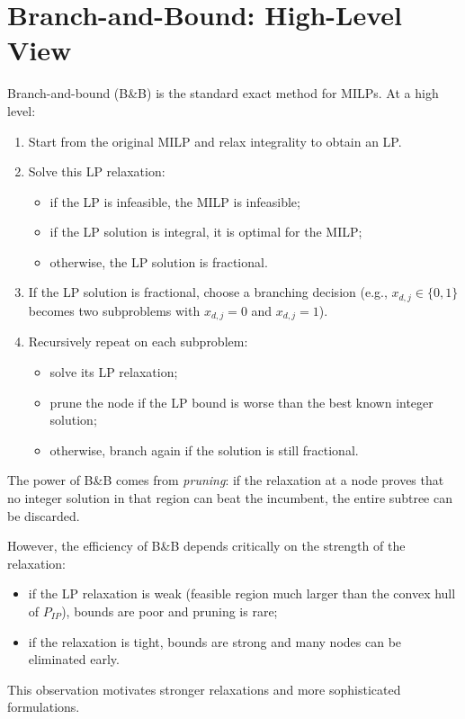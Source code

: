 \documentclass[11pt]{article}
\begin{document}
\section{Branch-and-Bound: High-Level View}

Branch-and-bound (B\&B) is the standard exact method for MILPs.
At a high level:
\begin{enumerate}
    \item Start from the original MILP and relax integrality to obtain an LP.
    \item Solve this LP relaxation:
    \begin{itemize}
        \item if the LP is infeasible, the MILP is infeasible;
        \item if the LP solution is integral, it is optimal for the MILP;
        \item otherwise, the LP solution is fractional.
    \end{itemize}
    \item If the LP solution is fractional, choose a branching decision
          (e.g., $x_{d,j} \in \{0,1\}$ becomes two subproblems with
          $x_{d,j} =0$ and $x_{d,j}=1$).
    \item Recursively repeat on each subproblem:
    \begin{itemize}
        \item solve its LP relaxation;
        \item prune the node if the LP bound is worse than the best known integer solution;
        \item otherwise, branch again if the solution is still fractional.
    \end{itemize}
\end{enumerate}
The power of B\&B comes from \emph{pruning}:
if the relaxation at a node proves that no integer solution in that region can
beat the incumbent, the entire subtree can be discarded.

However, the efficiency of B\&B depends critically on the strength of the
relaxation:
\begin{itemize}
    \item if the LP relaxation is weak (feasible region much larger than the
          convex hull of $P_{IP}$), bounds are poor and pruning is rare;
    \item if the relaxation is tight, bounds are strong and many nodes can be
          eliminated early.
\end{itemize}
This observation motivates stronger relaxations and more sophisticated
formulations.
\end{document}

